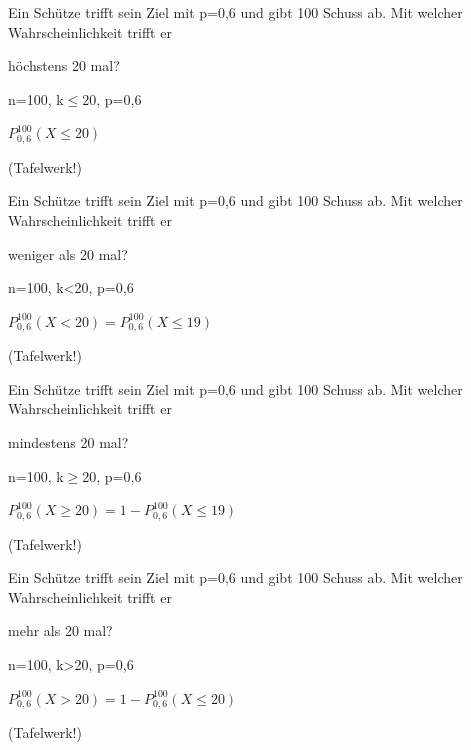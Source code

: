 \documentclass[paper=a6,landscape,ngerman,twoside=true,fontsize=12pt]{scrartcl}
\begin{document}
\begin{frage}
	\large
	Ein Schütze trifft sein Ziel mit p=0,6 und gibt 100 Schuss ab. Mit welcher Wahrscheinlichkeit trifft er 
	
	\LARGE 
	höchstens 20 mal?
	
\end{frage}
\begin{antwort}
	n=100, k$\leq$20, p=0,6
	
	\bigskip
	$P^{100}_{0,6}(X\leq 20)$
	
	(Tafelwerk!)
	
\end{antwort}
\begin{frage}
	\large
	Ein Schütze trifft sein Ziel mit p=0,6 und gibt 100 Schuss ab. Mit welcher Wahrscheinlichkeit trifft er 
	
	\LARGE 
	weniger als 20 mal?
	
\end{frage}
\begin{antwort}
	n=100, k<20, p=0,6
	
	\bigskip
	$P^{100}_{0,6}(X<20)=P^{100}_{0,6}(X\leq19)$
	
	(Tafelwerk!)
	
\end{antwort}
\begin{frage}
	\large
	Ein Schütze trifft sein Ziel mit p=0,6 und gibt 100 Schuss ab. Mit welcher Wahrscheinlichkeit trifft er 
	
	\LARGE 
	mindestens 20 mal?
	
\end{frage}
\begin{antwort}
	n=100, k$\geq$20, p=0,6
	
	\bigskip
	$P^{100}_{0,6}(X\geq 20)=1-P^{100}_{0,6}(X\leq 19)$
	
	 (Tafelwerk!)
	
\end{antwort}
\begin{frage}
	\large
	Ein Schütze trifft sein Ziel mit p=0,6 und gibt 100 Schuss ab. Mit welcher Wahrscheinlichkeit trifft er 
	
	\LARGE 
	mehr als 20 mal?
	
\end{frage}
\begin{antwort}
	n=100, k>20, p=0,6
	
	\bigskip
	$P^{100}_{0,6}(X>20)=1-P^{100}_{0,6}(X\leq 20)$
	
	(Tafelwerk!)
	
\end{antwort}
\end{document}
